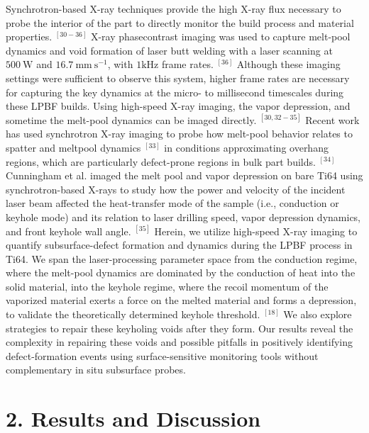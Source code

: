 \documentclass[10pt]{article}
\begin{document}
Synchrotron-based X-ray techniques provide the high X-ray flux necessary to probe the interior of the part to directly monitor the build process and material properties. ${ }^{[30-36]}$ X-ray phasecontrast imaging was used to capture melt-pool dynamics and void formation of laser butt welding with a laser scanning at $500 \mathrm{~W}$ and $16.7 \mathrm{~mm} \mathrm{~s}^{-1}$, with $1 \mathrm{kHz}$ frame rates. ${ }^{[36]}$ Although these imaging settings were sufficient to observe this system, higher frame rates are necessary for capturing the key dynamics at the micro- to millisecond timescales during these LPBF builds. Using high-speed X-ray imaging, the vapor depression, and sometime the melt-pool dynamics can be imaged directly. ${ }^{[30,32-35]}$ Recent work has used synchrotron X-ray imaging to probe how melt-pool behavior relates to spatter and meltpool dynamics ${ }^{[33]}$ in conditions approximating overhang regions, which are particularly defect-prone regions in bulk part builds. ${ }^{[34]}$ Cunningham et al. imaged the melt pool and vapor depression on bare Ti64 using synchrotron-based X-rays to study how the power and velocity of the incident laser beam affected the heat-transfer mode of the sample (i.e., conduction or keyhole mode) and its relation to laser drilling speed, vapor depression dynamics, and front keyhole wall angle. ${ }^{[35]}$ Herein, we utilize high-speed X-ray imaging to quantify subsurface-defect formation and dynamics during the LPBF process in Ti64. We span the laser-processing parameter space from the conduction regime, where the melt-pool dynamics are dominated by the conduction of heat into the solid material, into the keyhole regime, where the recoil momentum of the vaporized material exerts a force on the melted material and forms a depression, to validate the theoretically determined keyhole threshold. ${ }^{[18]}$ We also explore strategies to repair these keyholing voids after they form. Our results reveal the complexity in repairing these voids and possible pitfalls in positively identifying defect-formation events using surface-sensitive monitoring tools without complementary in situ subsurface probes.

\section*{2. Results and Discussion}
\end{document}
